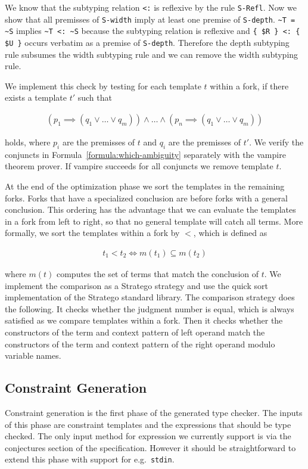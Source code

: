 We know that the subtyping relation \verb|<:| is reflexive by the rule
\verb|S-Refl|. Now we show that all premisses of \verb|S-width| imply
at least one premise of \verb|S-depth|. \verb|~T = ~S| implies
\verb|~T <: ~S| because the subtyping relation is reflexive and
\verb|{ $R } <: { $U }| occurs verbatim as a premise of
\verb|S-depth|. Therefore the depth subtyping rule subsumes the width
subtyping rule and we can remove the width subtyping rule.

We implement this check by testing for each template $t$ within a
fork, if there exists a template $t'$ such that

\begin{align}
  (p_1 \implies (q_1 \lor \dots \lor q_m)) \land \dots \land (p_n \implies
  (q_1 \lor \dots \lor q_m))
\label{formula:which-ambiguity}
\end{align}

holds, where $p_i$ are the premisses of $t$ and $q_i$ are the
premisses of $t'$. We verify the conjuncts in
Formula~\ref{formula:which-ambiguity} separately with the vampire
theorem prover. If vampire succeeds for all conjuncts we remove
template $t$. 

At the end of the optimization phase we sort the templates in the
remaining forks. Forks that have a specialized conclusion are before
forks with a general conclusion. This ordering has the advantage that
we can evaluate the templates in a fork from left to right, so that no
general template will catch all terms. More formally, we sort the
templates within a fork by $<$, which is defined as

\begin{align}
  t_1 < t_2 \iff m(t_1) \subseteq m(t_2)
\end{align}

where $m(t)$ computes the set of terms that match the conclusion of
$t$. We implement the comparison as a Stratego strategy and use the
quick sort implementation of the Stratego standard library. The
comparison strategy does the following. It checks whether the judgment
number is equal, which is always satisfied as we compare templates
within a fork. Then it checks whether the constructors of the term and
context pattern of left operand match the constructors of the term and
context pattern of the right operand modulo variable names.

\subsection{Constraint Generation}
\label{sec:constr-gener}
Constraint generation is the first phase of the generated type
checker. The inputs of this phase are constraint templates and the
expressions that should be type checked. The only input method for
expression we currently support is via the conjectures section of the
specification. However it should be straightforward to extend this
phase with support for e.g.\ \verb|stdin|.

